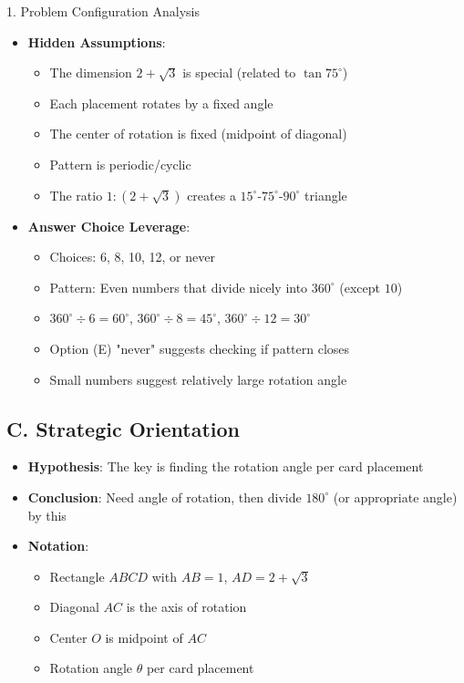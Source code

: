 \documentclass[12pt]{article}
\begin{document}
\begin{configbox}{1. Problem Configuration Analysis}
\begin{itemize}[leftmargin=*]
    \item \textbf{Hidden Assumptions}: 
    \begin{itemize}
        \item The dimension $2+\sqrt{3}$ is special (related to $\tan 75^\circ$)
        \item Each placement rotates by a fixed angle
        \item The center of rotation is fixed (midpoint of diagonal)
        \item Pattern is periodic/cyclic
        \item The ratio $1:(2+\sqrt{3})$ creates a $15^\circ$-$75^\circ$-$90^\circ$ triangle
    \end{itemize}
    
    \item \textbf{Answer Choice Leverage}: 
    \begin{itemize}
        \item Choices: 6, 8, 10, 12, or never
        \item Pattern: Even numbers that divide nicely into $360^\circ$ (except $10$)
        \item $360^\circ \div 6 = 60^\circ$, $360^\circ \div 8 = 45^\circ$, $360^\circ \div 12 = 30^\circ$
        \item Option (E) "never" suggests checking if pattern closes
        \item Small numbers suggest relatively large rotation angle
    \end{itemize}
\end{itemize}

\subsection*{C. Strategic Orientation}
\begin{itemize}[leftmargin=*]
    \item \textbf{Hypothesis}: The key is finding the rotation angle per card placement
    
    \item \textbf{Conclusion}: Need angle of rotation, then divide $180^\circ$ (or appropriate angle) by this
    
    \item \textbf{Notation}: 
    \begin{itemize}
        \item Rectangle $ABCD$ with $AB = 1$, $AD = 2+\sqrt{3}$
        \item Diagonal $AC$ is the axis of rotation
        \item Center $O$ is midpoint of $AC$
        \item Rotation angle $\theta$ per card placement
    \end{itemize}
    

\end{itemize}
\end{configbox}
\end{document}
